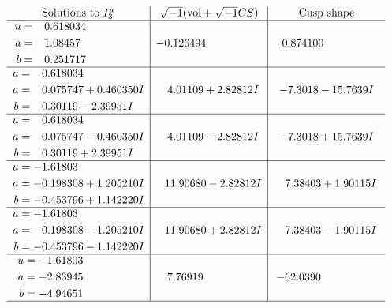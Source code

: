 \documentclass[1p]{elsarticle_modified}
\theoremstyle{definition}
\newcommand{\I}{\sqrt{-1}}
\begin{document}
$$\begin{array}{c|c|c}  
\text{Solutions to }I^u_{3}& \I (\text{vol} + \sqrt{-1}CS) & \text{Cusp shape}\\
 \hline 
\begin{aligned}
u &= \phantom{-}0.618034\phantom{ +0.000000I} \\
a &= \phantom{-}1.08457\phantom{ +0.000000I} \\
b &= \phantom{-}0.251717\phantom{ +0.000000I}\end{aligned}
 & -0.126494\phantom{ +0.000000I} & \phantom{-}0.874100\phantom{ +0.000000I} \\ \hline\begin{aligned}
u &= \phantom{-}0.618034\phantom{ +0.000000I} \\
a &= \phantom{-}0.075747 + 0.460350 I \\
b &= \phantom{-}0.30119 - 2.39951 I\end{aligned}
 & \phantom{-}4.01109 + 2.82812 I & -7.3018 - 15.7639 I \\ \hline\begin{aligned}
u &= \phantom{-}0.618034\phantom{ +0.000000I} \\
a &= \phantom{-}0.075747 - 0.460350 I \\
b &= \phantom{-}0.30119 + 2.39951 I\end{aligned}
 & \phantom{-}4.01109 - 2.82812 I & -7.3018 + 15.7639 I \\ \hline\begin{aligned}
u &= -1.61803\phantom{ +0.000000I} \\
a &= -0.198308 + 1.205210 I \\
b &= -0.453796 + 1.142220 I\end{aligned}
 & \phantom{-}11.90680 - 2.82812 I & \phantom{-}7.38403 + 1.90115 I \\ \hline\begin{aligned}
u &= -1.61803\phantom{ +0.000000I} \\
a &= -0.198308 - 1.205210 I \\
b &= -0.453796 - 1.142220 I\end{aligned}
 & \phantom{-}11.90680 + 2.82812 I & \phantom{-}7.38403 - 1.90115 I \\ \hline\begin{aligned}
u &= -1.61803\phantom{ +0.000000I} \\
a &= -2.83945\phantom{ +0.000000I} \\
b &= -4.94651\phantom{ +0.000000I}\end{aligned}
 & \phantom{-}7.76919\phantom{ +0.000000I} & -62.0390\phantom{ +0.000000I}\\
 \hline 
 \end{array}$$\newpage\newpage\renewcommand{\arraystretch}{1}
\end{document}
